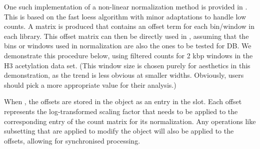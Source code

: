 \documentclass{report}\usepackage[]{graphicx}\usepackage[usenames,dvipsnames]{color}
\newcommand{\hlnum}[1]{\textcolor[rgb]{0.816,0.125,0.439}{#1}}%
\newcommand{\hlstr}[1]{\textcolor[rgb]{0.251,0.627,0.251}{#1}}%
\newcommand{\hlopt}[1]{\textcolor[rgb]{0,0,0}{#1}}%
\newcommand{\hlstd}[1]{\textcolor[rgb]{0.251,0.251,0.251}{#1}}%
\newcommand{\hlkwb}[1]{\textcolor[rgb]{0,0,0}{#1}}%
\newcommand{\hlkwc}[1]{\textcolor[rgb]{0.251,0.251,0.251}{#1}}%
\newcommand{\hlkwd}[1]{\textcolor[rgb]{0.878,0.439,0.125}{#1}}%
\newenvironment{knitrout}{}{} %
\begin{document}
One such implementation of a non-linear normalization method is provided in .
This is based on the fast loess algorithm \cite{ballman2004} with minor adaptations to handle low counts. 
A matrix is produced that contains an offset term for each bin/window in each library.
This offset matrix can then be directly used in , assuming that the bins or windows used in normalization are also the ones to be tested for DB.
We demonstrate this procedure below, using filtered counts for 2 kbp windows in the H3 acetylation data set.
(This window size is chosen purely for aesthetics in this demonstration, as the trend is less obvious at smaller widths.
Obviously, users should pick a more appropriate value for their analysis.)

\begin{knitrout}
\color{fgcolor}
\end{knitrout}

When , the offsets are stored in the  object as an  entry in the  slot.
Each offset represents the log-transformed scaling factor that needs to be applied to the corresponding entry of the count matrix for its normalization.
Any operations like subsetting that are applied to modify the object will also be applied to the offsets, allowing for synchronised processing.
\end{document}
